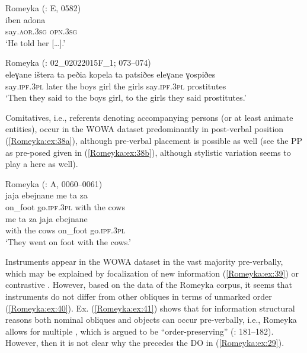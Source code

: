 \documentclass[output=paper,colorlinks,citecolor=brown]{langscibook}
\begin{document}
\ea\label{Romeyka:ex:36}
Romeyka (\citealt{schreiber2021pontic}: E, 0582) \\
\gll iben adona \\
say\textsc{.aor.3sg} \textsc{opn.3sg} \\
\glt `He told her […].'
\z

\ea\label{Romeyka:ex:37}
Romeyka (\citealt{schreiber_inprep}: 02\_02022015F\_1; 073--074) \\
\gll eleɣane ištera ta peðia kopela ta patsiðes eleɣane ɣospiðes \\
say\textsc{.ipf.3pl} later the boys girl the girls say\textsc{.ipf.3pl} prostitutes \\
\glt `Then they said to the boys girl, to the girls they said prostitutes.'  \\
\z

Comitatives, i.e., referents denoting accompanying persons (or at least animate entities), occur in the WOWA dataset predominantly in post-verbal position (\ref{Romeyka:ex:38a}), although pre-verbal placement is possible as well (see the PP as pre-posed given  in (\ref{Romeyka:ex:38b}), although stylistic variation seems to play a  here as well).

\ea\label{Romeyka:ex:38}
\ea\label{Romeyka:ex:38a}
Romeyka (\citealt{schreiber2021pontic}: A, 0060--0061) \\
\gll jaja ebejnane me ta za \\
on\_foot go\textsc{.ipf.3pl} with the cows \\
\ex\label{Romeyka:ex:38b}
\gll me ta za jaja ebejnane \\
with the cows on\_foot go\textsc{.ipf.3pl} \\
\glt `They went on foot with the cows.'  \\
\z
\z

Instruments appear in the WOWA dataset in the vast majority pre-verbally, which may be explained by focalization of new information (\ref{Romeyka:ex:39}) or contrastive . However, based on the data of the Romeyka corpus, it seems that instruments do not differ from other obliques in terms of unmarked  order (\ref{Romeyka:ex:40}). Ex. (\ref{Romeyka:ex:41}) shows that for information structural reasons both nominal obliques and objects can occur pre-verbally, i.e., Romeyka allows for multiple , which is argued to be ``order-preserving'' (\citealt{neocleous_word_2020}: 181--182). However, then it is not clear why the  precedes the DO in (\ref{Romeyka:ex:29}). 
\end{document}
